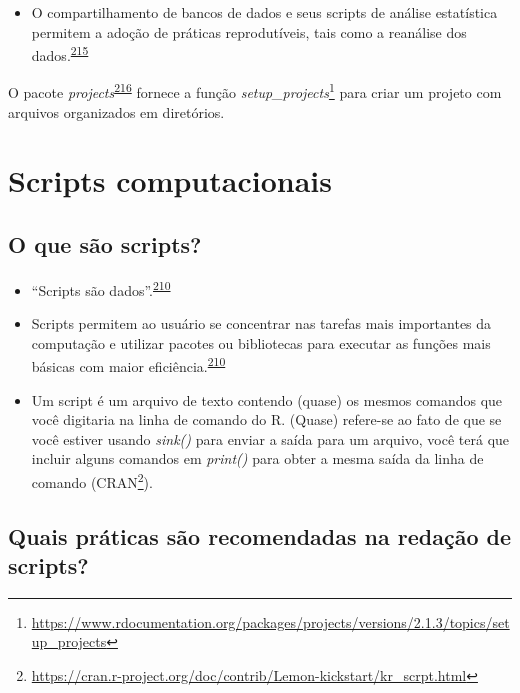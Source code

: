 \documentclass[
  a4paper,
]{book}
\providecommand{\tightlist}{%
  \setlength{\itemsep}{0pt}\setlength{\parskip}{0pt}}
\renewcommand{\href}[2]{#2\footnote{\url{#1}}}
\newenvironment{infobox}[1]
  {
  \begin{itemize}
  \renewcommand{\labelitemi}{
    \raisebox{-.7\height}[0pt][0pt]{
      {\setkeys{Gin}{width=3em,keepaspectratio}
        \texttt{[image: \#1]}}
    }
  }
  \setlength{\fboxsep}{1em}
  \begin{blackbox}
  \item
  }
  {
  \end{blackbox}
  \end{itemize}
  }
\begin{document}
\begin{itemize}
\tightlist
\item
  O compartilhamento de bancos de dados e seus scripts de análise estatística permitem a adoção de práticas reprodutíveis, tais como a reanálise dos dados.\textsuperscript{\protect\hyperlink{ref-ioannidis2014}{215}}
\end{itemize}

\begin{infobox}{images/Rlogo}
O pacote \emph{projects}\textsuperscript{\protect\hyperlink{ref-projects}{216}} fornece a função \href{https://www.rdocumentation.org/packages/projects/versions/2.1.3/topics/setup_projects}{\emph{setup\_projects}} para criar um projeto com arquivos organizados em diretórios.

\end{infobox}

\hypertarget{scripts-computacionais}{%
\section{Scripts computacionais}\label{scripts-computacionais}}

\hypertarget{o-que-suxe3o-scripts}{%
\subsection{O que são scripts?}\label{o-que-suxe3o-scripts}}

\begin{itemize}
\item
  ``Scripts são dados''.\textsuperscript{\protect\hyperlink{ref-hinsen2011}{210}}
\item
  Scripts permitem ao usuário se concentrar nas tarefas mais importantes da computação e utilizar pacotes ou bibliotecas para executar as funções mais básicas com maior eficiência.\textsuperscript{\protect\hyperlink{ref-hinsen2011}{210}}
\item
  Um script é um arquivo de texto contendo (quase) os mesmos comandos que você digitaria na linha de comando do R. (Quase) refere-se ao fato de que se você estiver usando \emph{sink()} para enviar a saída para um arquivo, você terá que incluir alguns comandos em \emph{print()} para obter a mesma saída da linha de comando (\href{https://cran.r-project.org/doc/contrib/Lemon-kickstart/kr_scrpt.html}{CRAN}).
\end{itemize}

\hypertarget{quais-pruxe1ticas-suxe3o-recomendadas-na-redauxe7uxe3o-de-scripts}{%
\subsection{Quais práticas são recomendadas na redação de scripts?}\label{quais-pruxe1ticas-suxe3o-recomendadas-na-redauxe7uxe3o-de-scripts}}
\end{document}
